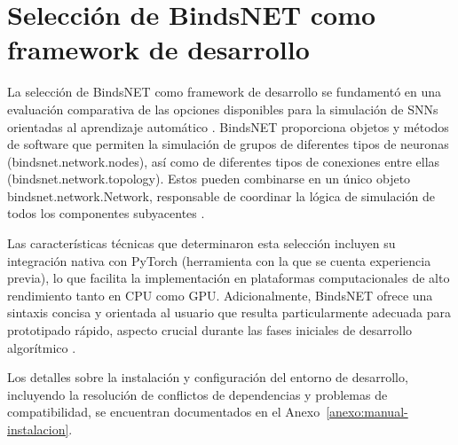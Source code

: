 \section{Selección de BindsNET como framework de desarrollo}

La selección de BindsNET como framework de desarrollo se fundamentó en una evaluación comparativa de las opciones disponibles para la simulación de SNNs orientadas al aprendizaje automático \cite{Hazan2018_BindsNET}. BindsNET proporciona objetos y métodos de software que permiten la simulación de grupos de diferentes tipos de neuronas (bindsnet.network.nodes), así como de diferentes tipos de conexiones entre ellas (bindsnet.network.topology). Estos pueden combinarse en un único objeto bindsnet.network.Network, responsable de coordinar la lógica de simulación de todos los componentes subyacentes \cite{bindsnet_docs}.

Las características técnicas que determinaron esta selección incluyen su integración nativa con PyTorch (herramienta con la que se cuenta experiencia previa), lo que facilita la implementación en plataformas computacionales de alto rendimiento tanto en CPU como GPU. Adicionalmente, BindsNET ofrece una sintaxis concisa y orientada al usuario que resulta particularmente adecuada para prototipado rápido, aspecto crucial durante las fases iniciales de desarrollo algorítmico \cite{bindsnet_docs}.

Los detalles sobre la instalación y configuración del entorno de desarrollo, incluyendo la resolución de conflictos de dependencias y problemas de compatibilidad, se encuentran documentados en el Anexo~\ref{anexo:manual-instalacion}.